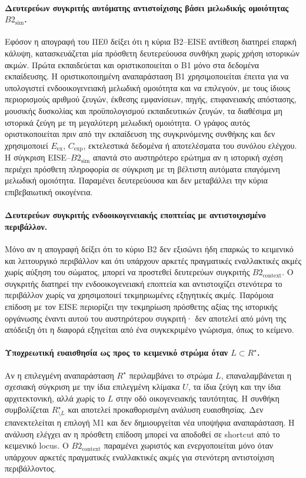 \documentclass[11pt,a4paper]{article}
\begin{document}
\paragraph{Δευτερεύων συγκριτής αυτόματης αντιστοίχισης βάσει μελωδικής ομοιότητας $B2_{\mathrm{sim}}$.}
Εφόσον η απογραφή του ΠΕ0 δείξει ότι η κύρια B2--EISE αντίθεση διατηρεί επαρκή κάλυψη, κατασκευάζεται μία πρόσθετη δευτερεύουσα συνθήκη χωρίς χρήση ιστορικών ακμών. Πρώτα εκπαιδεύεται και οριστικοποιείται ο B1 μόνο στα δεδομένα εκπαίδευσης. Η οριστικοποιημένη αναπαράσταση B1 χρησιμοποιείται έπειτα για να υπολογιστεί ενδοοικογενειακή μελωδική ομοιότητα και να επιλεγούν, με τους ίδιους περιορισμούς αριθμού ζευγών, έκθεσης εμφανίσεων, πηγής, επιφανειακής απόστασης, μουσικής δυσκολίας και προϋπολογισμού εκπαιδευτικών ζευγών, τα διαθέσιμα μη ιστορικά ζεύγη με τη μεγαλύτερη μελωδική ομοιότητα. Ο γράφος αυτός οριστικοποιείται πριν από την εκπαίδευση της συγκρινόμενης συνθήκης και δεν χρησιμοποιεί $E_{\mathrm{ex}}$, $C_{\mathrm{exp}}$, εκτελεστικά δεδομένα ή αποτελέσματα του συνόλου ελέγχου. Η σύγκριση EISE--$B2_{\mathrm{sim}}$ απαντά στο αυστηρότερο ερώτημα αν η ιστορική σχέση περιέχει πρόσθετη πληροφορία σε σύγκριση με τη βέλτιστη αυτόματα επαγόμενη μελωδική ομοιότητα. Παραμένει δευτερεύουσα και δεν μεταβάλλει την κύρια επιβεβαιωτική οικογένεια.

\paragraph{Δευτερεύων συγκριτής ενδοοικογενειακής εποπτείας με αντιστοιχισμένο περιβάλλον.}
Μόνο αν η απογραφή δείξει ότι το κύριο B2 δεν εξισώνει ήδη επαρκώς το κειμενικό και λειτουργικό περιβάλλον και ότι υπάρχουν αρκετές πραγματικές εναλλακτικές ακμές χωρίς αύξηση του σώματος, μπορεί να προστεθεί δευτερεύων συγκριτής $B2_{\mathrm{context}}$. Ο συγκριτής διατηρεί την ενδοοικογενειακή εποπτεία και αντιστοιχίζει στενότερα το περιβάλλον χωρίς να χρησιμοποιεί τεκμηριωμένες εξηγητικές ακμές. Παρόμοια επίδοση με τον EISE περιορίζει την τεκμηρίωση πρόσθετης αξίας της ιστορικής οργάνωσης έναντι αυτού του αυστηρότερου συγκριτή· δεν αποτελεί από μόνη της απόδειξη ότι η διαφορά εξηγείται από ένα συγκεκριμένο γνώρισμα, όπως το κείμενο.

\paragraph{Υποχρεωτική ευαισθησία ως προς το κειμενικό στρώμα όταν $L\subset R^\star$.}
Αν η επιλεγμένη αναπαράσταση $R^\star$ περιλαμβάνει το στρώμα $L$, επαναλαμβάνεται η σχεσιακή σύγκριση με την ίδια επιλεγμένη κλίμακα $U$, τα ίδια ζεύγη και την ίδια αρχιτεκτονική, αλλά χωρίς το $L$ στην οδό οικογενειακής ταυτότητας. Η συνθήκη συμβολίζεται $R^\star_{\setminus L}$ και αποτελεί προκαθορισμένη ανάλυση ευαισθησίας. Δεν επανεκτελείται η επιλογή M1 και δεν δημιουργείται νέα υποψήφια αναπαράσταση. Η ανάλυση ελέγχει αν η πρόσθετη επίδοση μπορεί να αποδοθεί σε shortcut από το κειμενικό locus. Ο $B2_{\mathrm{context}}$ παραμένει χωριστός και ενεργοποιείται μόνο όταν υπάρχουν αρκετές πραγματικές εναλλακτικές ακμές για στενότερη αντιστοίχιση περιβάλλοντος.
\end{document}
